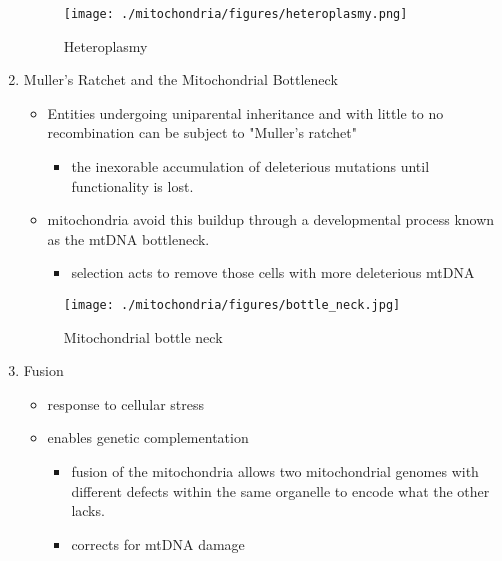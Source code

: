 \documentclass{scrartcl}
\begin{document}
\begin{enumerate}
\begin{figure}[htbp]
\centering
\texttt{[image: ./mitochondria/figures/heteroplasmy.png]}
\caption[heter]{\label{fig:org5a81f39}
Heteroplasmy}
\end{figure}

\item Muller's Ratchet and the Mitochondrial Bottleneck
\label{sec:org9489ac4}
\begin{itemize}
\item Entities undergoing uniparental inheritance and with little to no
recombination can be subject to "Muller's ratchet"
\begin{itemize}
\item the inexorable accumulation of deleterious mutations until
functionality is lost.
\end{itemize}

\item mitochondria avoid this buildup through a developmental process
known as the mtDNA bottleneck. 
\begin{itemize}
\item selection acts to remove those cells with more deleterious mtDNA
\end{itemize}
\end{itemize}

\begin{figure}[htbp]
\centering
\texttt{[image: ./mitochondria/figures/bottle\_neck.jpg]}
\caption[bottle]{\label{fig:org719ac66}
Mitochondrial bottle neck}
\end{figure}

\item Fusion
\label{sec:org6990852}
\begin{itemize}
\item response to cellular stress
\item enables genetic complementation
\begin{itemize}
\item fusion of the mitochondria allows two mitochondrial genomes with
different defects within the same organelle to encode what the
other lacks.
\item corrects for mtDNA damage
\end{itemize}
\end{itemize}


\end{enumerate}
\end{document}
